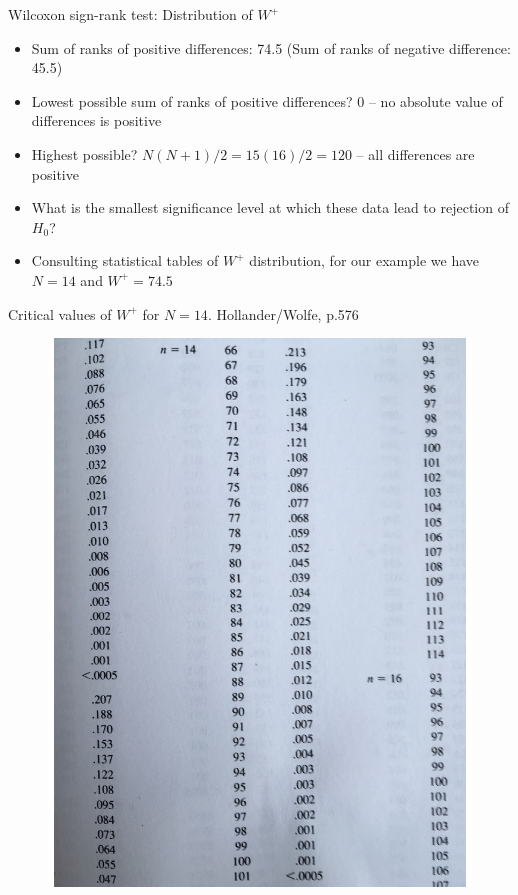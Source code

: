 \documentclass[xcolor=table,dvipsnames]{beamer}
\begin{document}
\begin{frame}{Wilcoxon sign-rank test: Distribution of $W^+$}
\begin{itemize}
\item Sum of ranks of positive differences: 74.5 (Sum of ranks of negative difference: 45.5) \pause
\item Lowest possible sum of ranks of positive differences? \pause $0$ -- no absolute value of differences is positive \pause
\item Highest possible? $N(N+1)/2 = 15(16)/2 = 120$ -- all differences are positive \pause
\item What is the smallest significance level at which these data lead to rejection of $H_0$? \pause
\item Consulting statistical tables of $W^+$ distribution, for our example we have $N=14$ and $W^+=74.5$ 
\end{itemize}
\end{frame}

\begin{frame}{Critical values of $W^+$ for $N=14$. Hollander/Wolfe, p.576}
\begin{figure}[H]\centering
\includegraphics[scale=.27]{pictures/wilcoxonRankSignTableN14.pdf}
\end{figure}
\end{frame}
\end{document}
